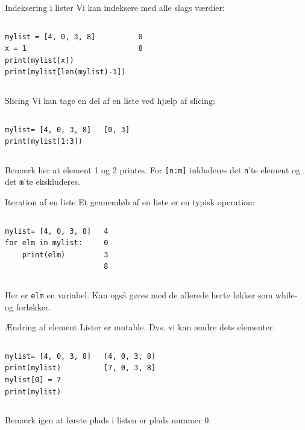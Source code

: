 \begin{frame}[fragile]{Indeksering i lister}
Vi kan indeksere med alle slags værdier:
\begin{columns}
	\begin{lstlisting}[style=python]
mylist = [4, 0, 3, 8]
x = 1
print(mylist[x])
print(mylist[len(mylist)-1])
	\end{lstlisting}
	\pause
	\begin{lstlisting}[style=python]
0
8
	\end{lstlisting}
\end{columns}

\end{frame}

\begin{frame}[fragile]{Slicing}
	Vi kan tage en del af en liste ved hjælp af slicing:
	\begin{columns}
		\begin{lstlisting}[style=python]
mylist= [4, 0, 3, 8]
print(mylist[1:3])
		\end{lstlisting}
		\pause
		\begin{lstlisting}[style=python]
[0, 3]
		\end{lstlisting}
	\end{columns}
	Bemærk her at element 1 og 2 printes. For \texttt{[n:m]} inkluderes det \texttt{n}'te element og det \texttt{m}'te ekskluderes.
\end{frame}


\begin{frame}[fragile]{Iteration af en liste}
	Et gennemløb af en liste er en typisk operation:
	\begin{columns}
		\column{0.4\textwidth}
		\begin{lstlisting}[style=python]
mylist= [4, 0, 3, 8]
for elm in mylist:
	print(elm)
		\end{lstlisting}
		\column{0.4\textwidth}
		\begin{lstlisting}[style=python]
4
0
3
8
		\end{lstlisting}
	\end{columns}
	Her er \texttt{elm} en variabel. Kan også gøres med de allerede lærte løkker som while- og forløkker.
\end{frame}

\begin{frame}[fragile]{Ændring af element}
	Lister er mutable. Dvs. vi kan ændre dets elementer.
	\begin{columns}
		\begin{lstlisting}[style=python]
mylist= [4, 0, 3, 8]
print(mylist)
mylist[0] = 7
print(mylist)
		\end{lstlisting}
		\begin{lstlisting}[style=python]
[4, 0, 3, 8]
[7, 0, 3, 8]
		\end{lstlisting}
	\end{columns}
	Bemærk igen at første plads i listen er plads nummer 0.
\end{frame}


